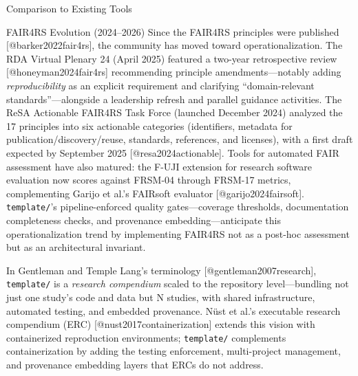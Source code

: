 \documentclass[
  ignorenonframetext,
]{beamer}
\begin{document}
\begin{frame}[fragile]{Comparison to Existing Tools}
\begin{block}{FAIR4RS Evolution (2024--2026)}
\protect{}\label{fair4rs-evolution-20242026}
Since the FAIR4RS principles were published {[}@barker2022fair4rs{]},
the community has moved toward operationalization. The RDA Virtual
Plenary 24 (April 2025) featured a two-year retrospective review
{[}@honeyman2024fair4rs{]} recommending principle amendments---notably
adding \emph{reproducibility} as an explicit requirement and clarifying
``domain-relevant standards''---alongside a leadership refresh and
parallel guidance activities. The ReSA Actionable FAIR4RS Task Force
(launched December 2024) analyzed the 17 principles into six actionable
categories (identifiers, metadata for publication/discovery/reuse,
standards, references, and licenses), with a first draft expected by
September 2025 {[}@resa2024actionable{]}. Tools for automated FAIR
assessment have also matured: the F-UJI extension for research software
evaluation now scores against FRSM-04 through FRSM-17 metrics,
complementing Garijo et al.'s FAIRsoft evaluator
{[}@garijo2024fairsoft{]}. \texttt{template/}'s pipeline-enforced
quality gates---coverage thresholds, documentation completeness checks,
and provenance embedding---anticipate this operationalization trend by
implementing FAIR4RS not as a post-hoc assessment but as an
architectural invariant.

In Gentleman and Temple Lang's terminology {[}@gentleman2007research{]},
\texttt{template/} is a \emph{research compendium} scaled to the
repository level---bundling not just one study's code and data but N
studies, with shared infrastructure, automated testing, and embedded
provenance. Nüst et al.'s executable research compendium (ERC)
{[}@nust2017containerization{]} extends this vision with containerized
reproduction environments; \texttt{template/} complements
containerization by adding the testing enforcement, multi-project
management, and provenance embedding layers that ERCs do not address.
\end{block}
\end{frame}
\end{document}
